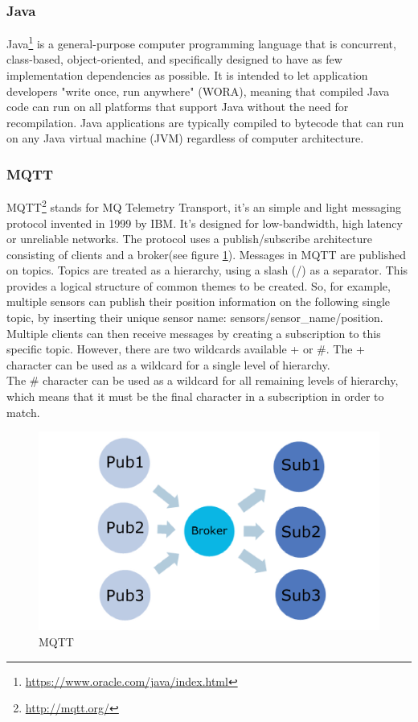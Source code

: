 \documentclass[12pt]{article}
\begin{document}
\subsubsection{Java}
Java\footnote{\url{https://www.oracle.com/java/index.html}} is a general-purpose computer programming language that is concurrent, class-based, object-oriented, and specifically designed to have as few implementation dependencies as possible. It is intended to let application developers "write once, run anywhere" (WORA), meaning that compiled Java code can run on all platforms that support Java without the need for recompilation. Java applications are typically compiled to bytecode that can run on any Java virtual machine (JVM) regardless of computer architecture.
\newpage

\subsubsection{MQTT}
MQTT\footnote{\url{http://mqtt.org/}} stands for MQ Telemetry Transport, it's an simple and light messaging protocol invented in 1999 by IBM. It's designed for low-bandwidth, high latency or unreliable networks. The protocol uses a publish/subscribe architecture consisting of clients and a broker(see figure \ref{img:mqtt}). Messages in MQTT are published on topics. Topics are treated as a hierarchy, using a slash (/) as a separator. This provides a logical structure of common themes to be created. So, for example, multiple sensors can publish their position information on the following single topic, by inserting their unique sensor name: sensors/sensor\_name/position.\\
Multiple clients can then receive messages by creating a subscription to this specific topic. However, there are two wildcards available + or \#. The + character can be used as a wildcard for a single level of hierarchy.\\
The \# character can be used as a wildcard for all remaining levels of hierarchy, which means that it must be the final character in a subscription in order to match.

\begin{figure}[H]
	\includegraphics[width=\textwidth]{mqtt.png}
	\caption{MQTT} 
	\label{img:mqtt}	
\end{figure}
\end{document}
